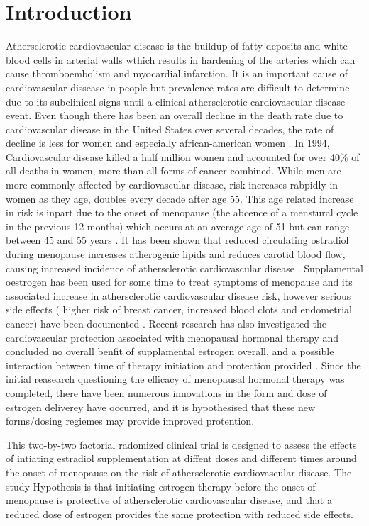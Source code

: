 \documentclass[11pt]{article}
\begin{document}
	\section{Introduction} 
		Athersclerotic cardiovascular disease is the buildup of fatty deposits and white blood cells in arterial walls wthich results in hardening of the arteries which can cause thromboembolism and myocardial infarction.
		It is an important cause of cardiovascular dissease in people but prevalence rates are difficult to determine due to its subclinical signs until a clinical athersclerotic cardiovascular disease event.
		Even though there has been an overall decline in the death rate due to cardiovascular disease in the United States over several decades, the rate of decline is less for women and especially african-american women \cite{Mosca1997}.
		In 1994, Cardiovascular disease killed a half million women and accounted for over 40\% of all deaths in women, more than all forms of cancer combined\cite{AHA1997}.
		While men are more commonly affected by cardiovascular disease, risk increases rabpidly in women as they age, doubles every decade after age 55\cite{Gordon1978}. 
		This age related increase in risk is inpart due to the onset of menopause (the abcence of a menstural cycle in the previous 12 months) which occurs at an average age of 51 but can range between 45 and 55 years \cite{Gold2012}. 
		It has been shown that reduced circulating ostradiol during menopause increases atherogenic lipids and reduces carotid blood flow, causing increased incidence of athersclerotic cardiovascular disease \cite{Hodis}.
		Supplamental oestrogen has been used for some time to treat symptoms of menopause and its associated increase in athersclerotic cardiovascular disease risk, however serious side effects ( higher risk of breast cancer, increased blood clots and endometrial cancer) have been documented \cite{Gold2012}.
		Recent research has also investigated the cardiovascular protection associated with menopausal hormonal therapy and concluded no overall benfit of supplamental estrogen overall, and a possible interaction between time of therapy initiation and protection provided \cite{Anderson2004,Prentice2009}.
		Since the initial reasearch questioning the efficacy of menopausal hormonal therapy was completed, there have been numerous innovations in the form and dose of estrogen deliverey have occurred, and it is hypothesised that these new forms/dosing regiemes may provide improved protention.



		This two-by-two factorial radomized clinical trial is designed to assess the effects of intiating estradiol supplementation at diffent doses and different times around the onset of menopause on the risk of athersclerotic cardiovascular disease.
		The study Hypothesis is that initiating estrogen therapy before the onset of menopause is protective of athersclerotic cardiovascular disease, and that a reduced dose of estrogen provides the same protection with reduced side effects.
\end{document}
